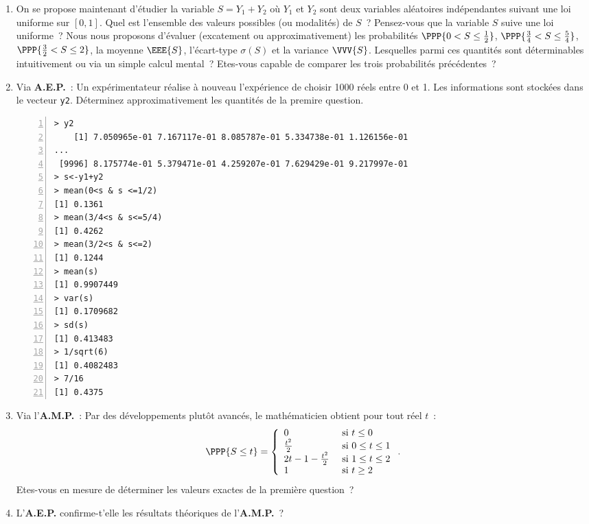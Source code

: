 \documentclass[10pt]{report}
\begin{document}
\begin{exercice}\label{ex:sommeUnifs}
\begin{enumerate}
\item On se propose maintenant d'étudier la variable $S=Y_1+Y_2$ où $Y_1$ et $Y_2$ sont deux variables aléatoires indépendantes suivant une loi uniforme sur $[0,1]$. Quel est l'ensemble des valeurs possibles (ou modalités) de $S$~? Pensez-vous que la variable $S$ suive une loi uniforme~?
Nous nous proposons d'évaluer (excatement ou approximativement) les probabilités $\PPP{0< S \leq \frac12}$, $\PPP{\frac34< S \leq \frac54}$, $\PPP{\frac32< S \leq 2}$, la moyenne $\EEE{S}$, l'écart-type $\sigma(S)$ et la variance $\VVV{S}$.  Lesquelles parmi ces quantités sont déterminables intuitivement ou via un simple calcul mental~? Etes-vous capable de comparer les trois probabilités précédentes~?


\item Via \textbf{A.E.P.}~: Un expérimentateur réalise à nouveau l'expérience de choisir 1000 réels entre 0 et 1. Les informations sont stockées dans le vecteur \texttt{y2}. Déterminez approximativement les quantités de la premire question.
\begin{Verbatim}[frame=leftline,fontfamily=tt,fontshape=n,numbers=left]
> y2
    [1] 7.050965e-01 7.167117e-01 8.085787e-01 5.334738e-01 1.126156e-01
...
 [9996] 8.175774e-01 5.379471e-01 4.259207e-01 7.629429e-01 9.217997e-01
> s<-y1+y2
> mean(0<s & s <=1/2)
[1] 0.1361
> mean(3/4<s & s<=5/4)
[1] 0.4262
> mean(3/2<s & s<=2)
[1] 0.1244
> mean(s)
[1] 0.9907449
> var(s)
[1] 0.1709682
> sd(s)
[1] 0.413483
> 1/sqrt(6)
[1] 0.4082483
> 7/16
[1] 0.4375
\end{Verbatim}


\item Via l'\textbf{A.M.P.}~: Par des développements plutôt avancés, le mathématicien obtient pour tout réel $t$~: 
$$
\PPP{S\leq t}= \left\{ \begin{array}{ll}
0 & \mbox{ si } t\leq 0 \\
\frac{t^2}2 & \mbox{ si } 0\leq t\leq 1 \\
2t-1-\frac{t^2}2& \mbox{ si } 1\leq t \leq 2 \\
1 & \mbox{ si } t\geq 2 
\end{array} \right..
$$ Etes-vous en mesure de déterminer les valeurs exactes de la première question~?

\item L'\textbf{A.E.P.} confirme-t'elle les résultats théoriques de l'\textbf{A.M.P.}~? 

\end{enumerate}
\end{exercice}
\end{document}
